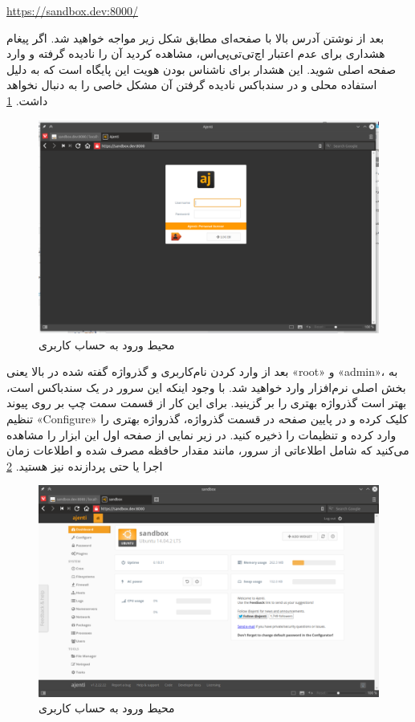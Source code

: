 \begin{latin}
\url{https://sandbox.dev:8000/}
\end{latin}

بعد از نوشتن آدرس بالا با صفحه‌ای مطابق شکل زیر مواجه خواهید شد. اگر پیغام هشداری برای عدم اعتبار اچ‌تی‌تی‌پی‌اس، مشاهده کردید آن را نادیده گرفته و وارد صفحه اصلی شوید. این هشدار برای ناشناس بودن هویت این پایگاه است که به دلیل استفاده محلی و در سندباکس نادیده گرفتن آن مشکل خاصی را به دنبال نخواهد داشت. \ref{SERVER-MANAGER-ANJETI1}

\begin{figure}
    \includegraphics[width=.9\textwidth ,height=.60\textwidth]{Pic/ANJETI1}
    \caption{ محیط ورود به حساب کاربری
    }
    \label{SERVER-MANAGER-ANJETI1}
\end{figure}

بعد از وارد کردن نام‌کاربری و گذرواژه گفته شده در بالا یعنی «root» و «admin»، به بخش اصلی نرم‌افزار وارد خواهید شد. با وجود اینکه این سرور در یک سندباکس است، بهتر است گذرواژه بهتری را بر گزینید. برای این کار از قسمت سمت چپ بر روی پیوند تنظیم «Configure» کلیک کرده  و در پایین صفحه در قسمت گذرواژه، گذرواژه بهتری را وارد کرده و تنظیمات را ذخیره کنید. در زیر نمایی از صفحه اول این ابزار را مشاهده می‌کنید که شامل اطلاعاتی از سرور، مانند مقدار حافظه مصرف شده و اطلاعات زمان اجرا یا حتی پردازنده نیز هستید.
\ref{SERVER-MANAGER-ANJETI2}
\begin{figure}
    \includegraphics[width=.9\textwidth ,height=.60\textwidth]{Pic/ANJETI2}
    \caption{ محیط ورود به حساب کاربری
    }
    \label{SERVER-MANAGER-ANJETI2}
\end{figure}

